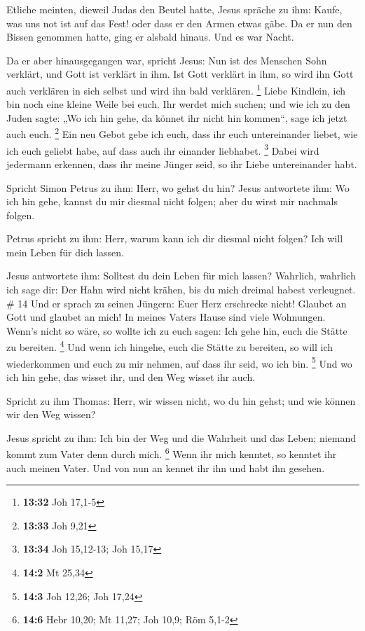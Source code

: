  Etliche meinten, dieweil Judas den Beutel hatte, Jesus
spräche zu ihm: Kaufe, was uns not ist auf das Fest! oder dass er den
Armen etwas gäbe.  Da er nun den Bissen genommen hatte,
ging er alsbald hinaus. Und es war Nacht.

 Da er aber hinausgegangen war, spricht Jesus: Nun ist des
Menschen Sohn verklärt, und Gott ist verklärt in ihm.  Ist
Gott verklärt in ihm, so wird ihn Gott auch verklären in sich selbst und
wird ihn bald verklären. \footnote{\textbf{13:32} Joh 17,1-5}
 Liebe Kindlein, ich bin noch eine kleine Weile bei euch.
Ihr werdet mich suchen; und wie ich zu den Juden sagte: „Wo ich hin
gehe, da könnet ihr nicht hin kommen``, sage ich jetzt auch euch.
\footnote{\textbf{13:33} Joh 9,21}  Ein neu Gebot gebe ich
euch, dass ihr euch untereinander liebet, wie ich euch geliebt habe, auf
dass auch ihr einander liebhabet. \footnote{\textbf{13:34} Joh 15,12-13;
  Joh 15,17}  Dabei wird jedermann erkennen, dass ihr meine
Jünger seid, so ihr Liebe untereinander habt.

 Spricht Simon Petrus zu ihm: Herr, wo gehst du hin? Jesus
antwortete ihm: Wo ich hin gehe, kannst du mir diesmal nicht folgen;
aber du wirst mir nachmals folgen.

 Petrus spricht zu ihm: Herr, warum kann ich dir diesmal
nicht folgen? Ich will mein Leben für dich lassen.

 Jesus antwortete ihm: Solltest du dein Leben für mich
lassen? Wahrlich, wahrlich ich sage dir: Der Hahn wird nicht krähen, bis
du mich dreimal habest verleugnet. \# 14  Und er sprach zu
seinen Jüngern: Euer Herz erschrecke nicht! Glaubet an Gott und glaubet
an mich!  In meines Vaters Hause sind viele Wohnungen.
Wenn's nicht so wäre, so wollte ich zu euch sagen: Ich gehe hin, euch
die Stätte zu bereiten. \footnote{\textbf{14:2} Mt 25,34} 
Und wenn ich hingehe, euch die Stätte zu bereiten, so will ich
wiederkommen und euch zu mir nehmen, auf dass ihr seid, wo ich bin.
\footnote{\textbf{14:3} Joh 12,26; Joh 17,24}  Und wo ich
hin gehe, das wisset ihr, und den Weg wisset ihr auch.

 Spricht zu ihm Thomas: Herr, wir wissen nicht, wo du hin
gehst; und wie können wir den Weg wissen?

 Jesus spricht zu ihm: Ich bin der Weg und die Wahrheit und
das Leben; niemand kommt zum Vater denn durch mich. \footnote{\textbf{14:6}
  Hebr 10,20; Mt 11,27; Joh 10,9; Röm 5,1-2}  Wenn ihr mich
kenntet, so kenntet ihr auch meinen Vater. Und von nun an kennet ihr ihn
und habt ihn gesehen.

